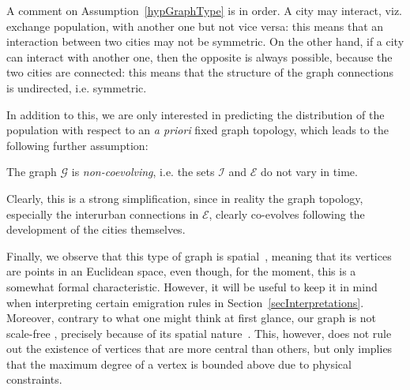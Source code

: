 \documentclass[a4paper]{article}
\begin{document}
A comment on Assumption~\ref{hypGraphType} is in order. A city may interact, viz. exchange population, with another one but not vice versa: this means that an interaction between two cities may not be symmetric. On the other hand, if a city can interact with another one, then the opposite is always possible, because the two cities are connected: this means that the structure of the graph connections is undirected, i.e. symmetric.

In addition to this, we are only interested in predicting the distribution of the population with respect to an \textit{a priori} fixed graph topology, which leads to the following further assumption:
\begin{hyp} \label{hypStaticGraph}
The graph $\mathcal G$ is \emph{non-coevolving}, i.e. the sets $\mathcal I$ and $\mathcal E$ do not vary in time.
\end{hyp}
Clearly, this is a strong simplification, since in reality the graph topology, especially the interurban connections in $\mathcal E$, clearly co-evolves following the development of the cities themselves.
            
Finally, we observe that this type of graph is spatial~\cite{Barthelemy2011,DeMontis2007}, meaning that its vertices are points in an Euclidean space, even though, for the moment, this is a somewhat formal characteristic. However, it will be useful to keep it in mind when interpreting certain emigration rules in Section~\ref{secInterpretations}. Moreover, contrary to what one might think at first glance, our graph is not scale-free \cite{Barabasi1999}, precisely because of its spatial nature~\cite{Barthelemy2011,Broido2019}. This, however, does not rule out the existence of vertices that are more central than others, but only implies that the maximum degree of a vertex is bounded above due to physical constraints.
    
\end{document}
